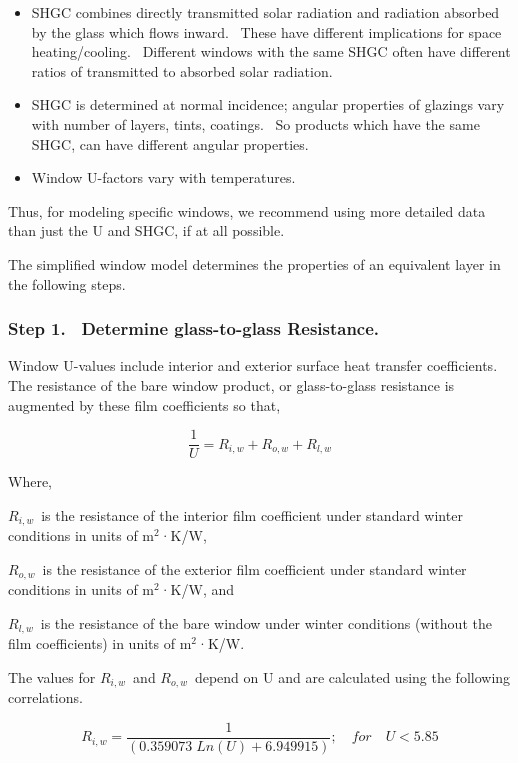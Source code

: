 \begin{itemize}
\item
  SHGC combines directly transmitted solar radiation and radiation absorbed by the glass which flows inward.~ These have different implications for space heating/cooling.~ Different windows with the same SHGC often have different ratios of transmitted to absorbed solar radiation.
\item
  SHGC is determined at normal incidence; angular properties of glazings vary with number of layers, tints, coatings.~ So products which have the same SHGC, can have different angular properties.
\item
  Window U-factors vary with temperatures.
\end{itemize}

Thus, for modeling specific windows, we recommend using more detailed data than just the U and SHGC, if at all possible.

The simplified window model determines the properties of an equivalent layer in the following steps.

\subsubsection{Step 1.~ Determine glass-to-glass Resistance.}\label{step-1.-determine-glass-to-glass-resistance.}

Window U-values include interior and exterior surface heat transfer coefficients.~ The resistance of the bare window product, or glass-to-glass resistance is augmented by these film coefficients so that,

\begin{equation}
\frac{1}{U} = {R_{i,w}} + {R_{o,w}} + {R_{l,w}}
\end{equation}

Where,

\({R_{i,w}}\)~is the resistance of the interior film coefficient under standard winter conditions in units of m\(^{2}\)·K/W,

\({R_{o,w}}\)~is the resistance of the exterior film coefficient under standard winter conditions in units of m\(^{2}\)·K/W, and

\({R_{l,w}}\)~is the resistance of the bare window under winter conditions (without the film coefficients) in units of m\(^{2}\)·K/W.

The values for \({R_{i,w}}\)~and \({R_{o,w}}\)~depend on U and are calculated using the following correlations.

\begin{equation}
{R_{i,w}} = \frac{1}{{(0.359073\;Ln(U) + 6.949915)}};\quad for\quad U < 5.85
\end{equation}

